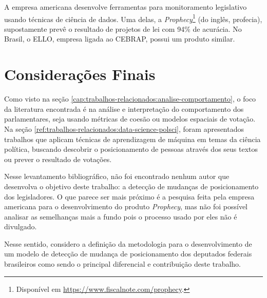 A empresa americana  desenvolve ferramentas para
monitoramento legislativo usando técnicas de ciência de dados. Uma delas, a
\emph{Prophecy}\footnote{Disponível em
\url{https://www.fiscalnote.com/prophecy}.} (do inglês, profecia), supostamente
prevê o resultado de projetos de lei com 94\% de acurácia. No Brasil, o
\gls{ELLO}, empresa ligada ao \gls{CEBRAP}, possui um produto similar.

\section{Considerações Finais}

Como visto na seção \ref{cap:trabalhos-relacionados:analise-comportamento}, o
foco da literatura encontrada é na análise e interpretação do comportamento dos
parlamentares, seja usando métricas de coesão ou modelos espaciais de votação.
Na seção \ref{ref:trabalhos-relacionados:data-science-polsci}, foram
apresentados trabalhos que aplicam técnicas de aprendizagem de máquina em temas
da ciência política, buscando descobrir o posicionamento de pessoas através dos
seus textos ou prever o resultado de votações.

Nesse levantamento bibliográfico, não foi encontrado nenhum autor que
desenvolva o objetivo deste trabalho: a detecção de mudanças de posicionamento
dos legisladores. O que parece ser mais próximo é a pesquisa feita pela empresa
americana  para o desenvolvimento do produto
\emph{Prophecy}, mas não foi possível analisar as semelhanças mais a fundo pois
o processo usado por eles não é divulgado.

Nesse sentido, considero a definição da metodologia para o desenvolvimento de
um modelo de detecção de mudança de posicionamento dos deputados federais
brasileiros como sendo o principal diferencial e contribuição deste trabalho.
